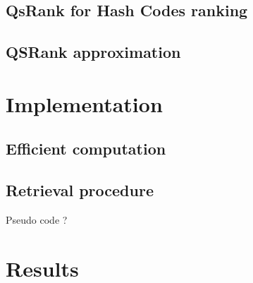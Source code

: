 \documentclass{article}
\begin{document}
\subsection{QsRank for Hash Codes ranking}

\subsection{QSRank approximation}

\section{Implementation}

\subsection{Efficient computation}

\subsection{Retrieval procedure}

Pseudo code ?

\section{Results}


\end{document}
